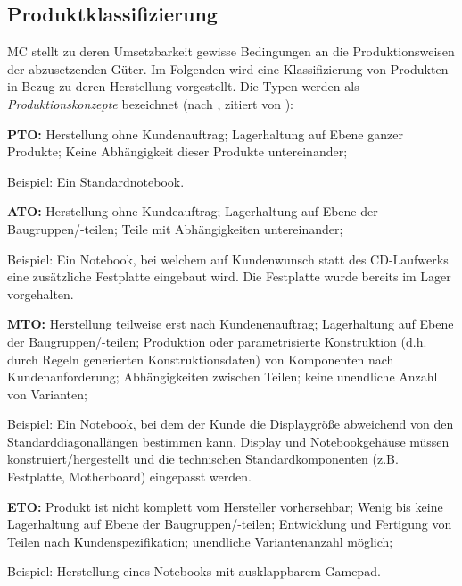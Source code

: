 \documentclass[11pt, a4paper, titlepage, listof=totoc, bibliography=totoc, index=totoc, twoside, openright, headings=normal]{scrreprt}
\begin{document}
\subsection{Produktklassifizierung}
\label{Produktklassifizierung}

\ac{MC} stellt zu deren Umsetzbarkeit gewisse Bedingungen an die Produktionsweisen der abzusetzenden Güter. Im Folgenden wird eine Klassifizierung von Produkten in Bezug zu deren Herstellung vorgestellt. Die Typen werden als \emph{Produktionskonzepte} bezeichnet  (nach \citealt{schuh06}, zitiert von \citealt{lutz11}):
\begin{compactitem}
	\item[\textbf{\ac{PTO}:}] Herstellung ohne Kundenauftrag; Lagerhaltung auf Ebene ganzer Produkte; Keine Abhängigkeit dieser Produkte untereinander;\vspace{0.3em}
	
	Beispiel: Ein Standardnotebook.
	\item[\textbf{\ac{ATO}:}] Herstellung ohne Kundeauftrag; Lagerhaltung auf Ebene der Baugruppen/-teilen; Teile mit Abhängigkeiten untereinander;\vspace{0.3em}
	
	Beispiel: Ein Notebook, bei welchem auf Kundenwunsch statt des CD-Laufwerks eine zusätzliche Festplatte eingebaut wird. Die Festplatte wurde bereits im Lager vorgehalten.
	\item[\textbf{\ac{MTO}:}] Herstellung teilweise erst nach Kundenenauftrag; Lagerhaltung auf Ebene der Baugruppen/-teilen; Produktion oder parametrisierte Konstruktion (d.h. durch Regeln generierten Konstruktionsdaten) von Komponenten nach Kundenanforderung; Abhängigkeiten zwischen Teilen; keine unendliche Anzahl von Varianten;\vspace{0.3em}

Beispiel: Ein Notebook, bei dem der Kunde die Displaygröße abweichend von den Standarddiagonallängen bestimmen kann. Display und Notebookgehäuse müssen konstruiert/hergestellt und die technischen Standardkomponenten (z.B. Festplatte, Motherboard) eingepasst werden. 
	\item[\textbf{\ac{ETO}:}] Produkt ist nicht komplett vom Hersteller vorhersehbar; Wenig bis keine Lagerhaltung auf Ebene der Baugruppen/-teilen; Entwicklung und Fertigung von Teilen nach Kundenspezifikation; unendliche Variantenanzahl möglich;\vspace{0.3em}

Beispiel: Herstellung eines Notebooks mit ausklappbarem Gamepad.
\end{compactitem}
\end{document}
